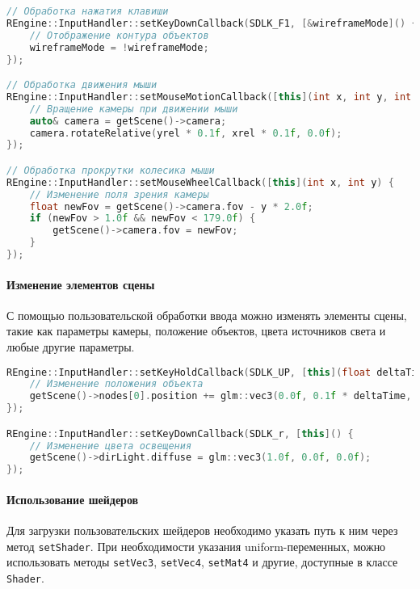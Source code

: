 \begin{lstlisting}[language=C++, caption=Пример настройки обработки ввода]
// Обработка нажатия клавиши
REngine::InputHandler::setKeyDownCallback(SDLK_F1, [&wireframeMode]() {
    // Отображение контура объектов
    wireframeMode = !wireframeMode;
});

// Обработка движения мыши
REngine::InputHandler::setMouseMotionCallback([this](int x, int y, int xrel, int yrel) {
    // Вращение камеры при движении мыши
    auto& camera = getScene()->camera;
    camera.rotateRelative(yrel * 0.1f, xrel * 0.1f, 0.0f);
});

// Обработка прокрутки колесика мыши
REngine::InputHandler::setMouseWheelCallback([this](int x, int y) {
    // Изменение поля зрения камеры
    float newFov = getScene()->camera.fov - y * 2.0f;
    if (newFov > 1.0f && newFov < 179.0f) {
        getScene()->camera.fov = newFov;
    }
});
\end{lstlisting}

\paragraph{Изменение элементов сцены}

С помощью пользовательской обработки ввода можно изменять элементы сцены, такие как параметры камеры, положение объектов, цвета источников света и любые другие параметры.

\begin{lstlisting}[language=C++, caption=Пример изменения параметров сцены]
REngine::InputHandler::setKeyHoldCallback(SDLK_UP, [this](float deltaTime) {
    // Изменение положения объекта
    getScene()->nodes[0].position += glm::vec3(0.0f, 0.1f * deltaTime, 0.0f);
});

REngine::InputHandler::setKeyDownCallback(SDLK_r, [this]() {
    // Изменение цвета освещения
    getScene()->dirLight.diffuse = glm::vec3(1.0f, 0.0f, 0.0f);
});
\end{lstlisting}

\paragraph{Использование шейдеров}

Для загрузки пользовательских шейдеров необходимо указать путь к ним через метод \texttt{setShader}. При необходимости указания uniform-переменных, можно использовать методы \texttt{setVec3}, \texttt{setVec4}, \texttt{setMat4} и другие, доступные в классе \texttt{Shader}.

